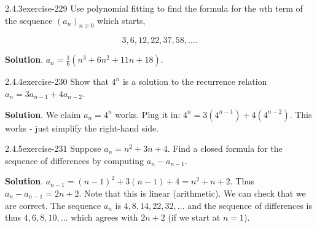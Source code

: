 \documentclass[twoside,11pt,]{book}
\numberwithin{equation}{chapter}
\begin{document}
\begin{divisionsolution}{2.4.3}{}{exercise-229}%
\hypertarget{p-3432}{}%
Use polynomial fitting to find the formula for the \(n\)th term of the sequence \((a_n)_{n \ge 0}\) which starts,%
\par
\hypertarget{p-3433}{}%
%
\begin{equation*}
3, 6, 12, 22, 37, 58, \ldots 
\text{.}
\end{equation*}
%
\par\smallskip%
\noindent\textbf{Solution}.\quad%
\hypertarget{p-3434}{}%
\(a_n = \frac{1}{6} (n^3 + 6n^2 + 11n + 18)\text{.}\)%
\end{divisionsolution}%
\begin{divisionsolution}{2.4.4}{}{exercise-230}%
\hypertarget{p-3435}{}%
Show that \(4^n\) is a solution to the recurrence relation \(a_n = 3a_{n-1} + 4a_{n-2}\).%
\par\smallskip%
\noindent\textbf{Solution}.\quad%
\hypertarget{p-3436}{}%
We claim \(a_n = 4^n\) works. Plug it in: \(4^n = 3(4^{n-1}) + 4(4^{n-2})\). This works - just simplify the right-hand side.%
\end{divisionsolution}%
\begin{divisionsolution}{2.4.5}{}{exercise-231}%
\hypertarget{p-3439}{}%
Suppose \(a_n = n^2 + 3n + 4\text{.}\) Find a closed formula for the sequence of differences by computing \(a_n - a_{n-1}\text{.}\)%
\par\smallskip%
\noindent\textbf{Solution}.\quad%
\hypertarget{p-3440}{}%
\(a_{n-1} = (n-1)^2 + 3(n-1) + 4 = n^2 + n + 2\text{.}\) Thus \(a_n - a_{n-1} = 2n+2\text{.}\) Note that this is linear (arithmetic). We can check that we are correct. The sequence \(a_n\) is \(4, 8, 14, 22, 32, \ldots\) and the sequence of differences is thus \(4, 6, 8, 10,\ldots\) which agrees with \(2n+2\) (if we start at \(n = 1\)).%
\end{divisionsolution}%
\end{document}
